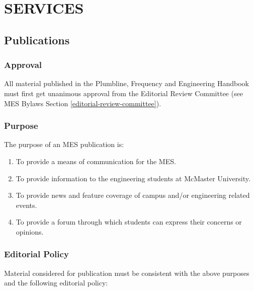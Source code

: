  \section{SERVICES}
\label{services}

\subsection{Publications}
\label{publications}

\subsubsection{Approval}
\label{approval}
All material published in the Plumbline, Frequency and Engineering
Handbook must first get unanimous approval from the Editorial Review
Committee (see MES Bylaws Section \ref{editorial-review-committee}).

\subsubsection{Purpose}
\label{purpose}

The purpose of an MES publication is:

\begin{enumerate}
 \item
  To provide a means of communication for the MES.
 \item
  To provide information to the engineering students at McMaster
  University.
 \item
  To provide news and feature coverage of campus and/or engineering
  related events.
 \item
  To provide a forum through which students can express their concerns
  or opinions.

\end{enumerate}

\subsubsection{Editorial Policy}
\label{editorial-policy}
Material considered for publication must be consistent with the above
purposes and the following editorial policy:

